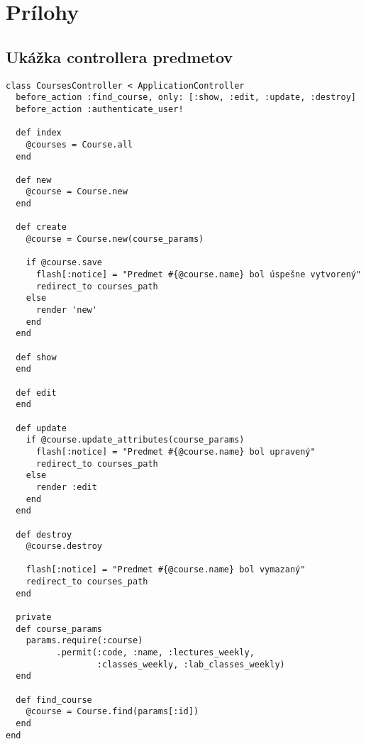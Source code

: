 \chapter*{Prílohy}

\section*{Ukážka controllera predmetov}
\label{sec:priloha_controller}

\begin{verbatim}
class CoursesController < ApplicationController
  before_action :find_course, only: [:show, :edit, :update, :destroy]
  before_action :authenticate_user!

  def index
    @courses = Course.all
  end

  def new
    @course = Course.new
  end

  def create
    @course = Course.new(course_params)

    if @course.save
      flash[:notice] = "Predmet #{@course.name} bol úspešne vytvorený"
      redirect_to courses_path
    else
      render 'new'
    end
  end

  def show
  end

  def edit
  end

  def update
    if @course.update_attributes(course_params)
      flash[:notice] = "Predmet #{@course.name} bol upravený"
      redirect_to courses_path
    else
      render :edit
    end
  end

  def destroy
    @course.destroy

    flash[:notice] = "Predmet #{@course.name} bol vymazaný"
    redirect_to courses_path
  end

  private
  def course_params
    params.require(:course)
          .permit(:code, :name, :lectures_weekly, 
                  :classes_weekly, :lab_classes_weekly)
  end

  def find_course
    @course = Course.find(params[:id])
  end
end
\end{verbatim}